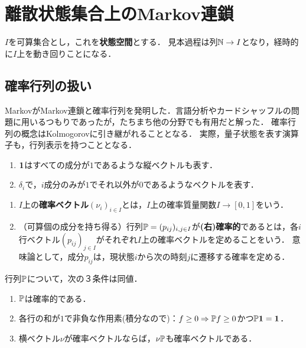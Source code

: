 \documentclass[uplatex,dvipdfmx]{jsreport}
\begin{document}
\section{離散状態集合上のMarkov連鎖}

\begin{notation}
    $I$を可算集合とし，これを\textbf{状態空間}とする．
    見本過程は列$\mathbb{N}\to I$となり，経時的に$I$上を動き回りことになる．
\end{notation}

\subsection{確率行列の扱い}

\begin{history}
    MarkovがMarkov連鎖と確率行列を発明した．言語分析やカードシャッフルの問題に用いるつもりであったが，たちまち他の分野でも有用だと解った．
    確率行列の概念はKolmogorovに引き継がれることとなる．
    実際，量子状態を表す演算子も，行列表示を持つこととなる．
\end{history}

\begin{notation}\mbox{}
    \begin{enumerate}
        \item $\mathbf{1}$はすべての成分が$1$であるような縦ベクトルも表す．
        \item $\delta_i$で，$i$成分のみが$1$でそれ以外が$0$であるようなベクトルを表す．
    \end{enumerate}
\end{notation}

\begin{definition}\mbox{}
    \begin{enumerate}
        \item $I$上の\textbf{確率ベクトル}$(\nu_i)_{i\in I}$とは，$I$上の確率質量関数$I\to[0,1]$をいう．
        \item （可算個の成分を持ち得る）行列$\mathbb{P}=(p_{ij})_{i,j\in I}$が\textbf{(右)確率的}であるとは，各$i$行ベクトル$(p_{ij})_{j\in I}$がそれぞれ$I$上の確率ベクトルを定めることをいう．
        意味論として，成分$p_{ij}$は，現状態$i$から次の時刻$j$に遷移する確率を定める．
    \end{enumerate}
\end{definition}

\begin{lemma}[確率行列の特徴付け]
    行列$\mathbb{P}$について，次の３条件は同値．
    \begin{enumerate}
        \item $\mathbb{P}$は確率的である．
        \item 各行の和が$1$で非負な作用素(積分なので)：$f\ge0\Rightarrow\mathbb{P} f\ge0$かつ$\mathbb{P}\mathbf{1}=\mathbf{1}$．
        \item 横ベクトル$\nu$が確率ベクトルならば，$\nu\mathbb{P}$も確率ベクトルである．
    \end{enumerate}
\end{lemma}
\end{document}

